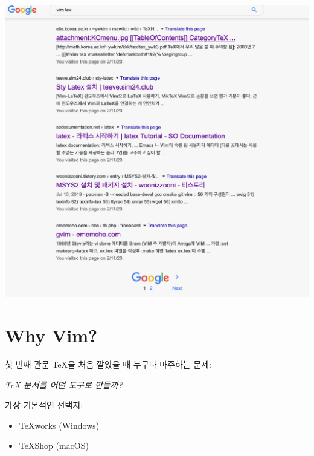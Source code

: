 \documentclass{beamer}
\begin{document}
\begin{frame}[plain]{}
  \centering\includegraphics[width=0.8\linewidth]{figures/google-vim-tex-result}
\end{frame}

\frame[plain]{\tableofcontents}

\section{Why Vim?}

\begin{frame}{첫 번째 관문}
  \TeX{}을 처음 깔았을 때 누구나 마주하는 문제:\\\pause\vpad
  \begin{center}\emph{\TeX{} 문서를 어떤 도구로 만들까?}\end{center}
  \pause\vpad

  가장 기본적인 선택지:
  \begin{itemize}
    \item \TeX{}works (Windows)
    \item \TeX{}Shop (macOS)
  \end{itemize}
\end{frame}
\end{document}
